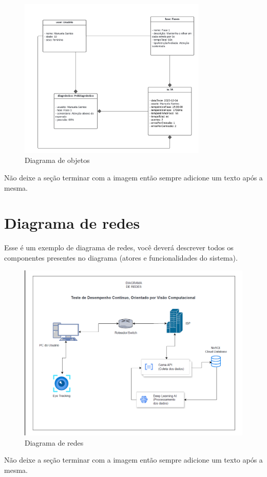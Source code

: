 \documentclass[
  a4paper,%
  12pt,%
  english,%
  brazilian,%
]{article}
\begin{document}
        \begin{figure}[h]
\centering
\caption{Diagrama de objetos}%
\label{fig:diagrama-de-objetos}
 \includegraphics[width=0.8\textwidth]{Logos/diagrama-de-objetos.png}
\end{figure}

Não deixe a seção terminar com a imagem então sempre adicione um texto após a mesma.

\section*{Diagrama de redes}
    Esse é um exemplo de diagrama de redes, você deverá descrever todos os componentes presentes no diagrama (atores e funcionalidades do sistema).

\begin{figure}[h]
\centering
\caption{Diagrama de redes}%
\label{fig:diagrama-de-redes}
\includegraphics[width=1.1\textwidth]{Logos/diagrama-de-redes.png}
\end{figure}

    Não deixe a seção terminar com a imagem então sempre adicione um texto após a mesma.
\end{document}
